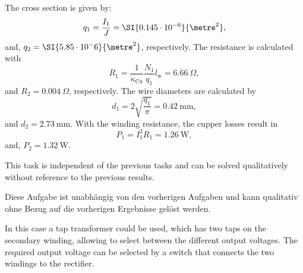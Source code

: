
\begin{solutionblock}
	The cross section is given by:
	$$ q_\mathrm{1} = \frac{I_\mathrm{1}}{J} = \SI{0.145\cdot10^{-6}}{\metre^2},$$
	and, $q_\mathrm{2} = \SI{5.85\cdot10{^-6}}{\metre^2}$, respectively. The resistance is calculated with
	$$ R_\mathrm{1} = \frac{1}{\kappa_\mathrm{Cu}} \frac{N_\mathrm{1}}{q_\mathrm{1}} l_\mathrm{w} = \SI{6.66}{\Omega},$$
	and $R_\mathrm{2} = \SI{0.004}{\Omega}$, respectively. The wire diameters are calculated by
	$$ d_\mathrm{1} = 2 \sqrt{\frac{q_\mathrm{1}}{\pi}} = \SI{0.42}{\milli\metre},$$
	and $d_\mathrm{2} = \SI{2.73}{\milli\metre}$. With the winding resistance, the cupper losses result in
	$$ P_\mathrm{1} = I_\mathrm{1}^2 R_\mathrm{1} = \SI{1.26}{\watt},$$
	and,
	$P_\mathrm{2} = \SI{1.32}{\watt}$.

\end{solutionblock}

\begin{hintblock}
	This task is independent of the previous tasks and can be solved qualitatively without reference to the previous results.
\end{hintblock}

\begin{germanhintblock}
	Diese Aufgabe ist unabhängig von den vorherigen Aufgaben und kann qualitativ ohne Bezug auf die vorherigen Ergebnisse gelöst werden.
\end{germanhintblock}

\begin{solutionblock}
	In this case a tap transformer could be used, which has two taps on the secondary winding, allowing to select between the different output voltages. The required output voltage can be selected by a switch that connects the two windings to the rectifier.
\end{solutionblock}
